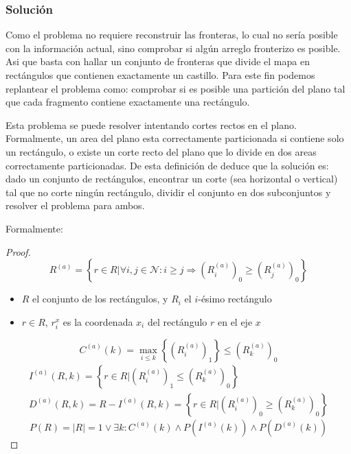 \subsubsection{Solución}

Como el problema no requiere reconstruir las fronteras, lo cual no sería posible con la información actual, sino comprobar si algún arreglo fronterizo es posible. Asi que basta con hallar un conjunto de fronteras que divide el mapa en rectángulos que contienen exactamente un castillo. Para este fin podemos replantear el problema como: comprobar si es posible una partición del plano tal que cada fragmento contiene exactamente una rectángulo.

Esta problema se puede resolver intentando cortes rectos en el plano. Formalmente, un area del plano esta correctamente particionada si contiene solo un rectángulo, o existe un corte recto del plano que lo divide en dos areas correctamente particionadas. De esta definición de deduce que la solución es: dado un conjunto de rectángulos, encontrar un corte (sea horizontal o vertical) tal que no corte ningún rectángulo, dividir el conjunto en dos subconjuntos y resolver el problema para ambos.

Formalmente:

\begin{proof}
  \begin{equation}
    R^{(a)}=\left\{r\in R|\forall i,j\in \mathcal{N}:i\geq j\Rightarrow (R^{(a)}_i)_0\geq(R^{(a)}_j)_0\right\}
    \label{eq:sortedby}
  \end{equation}
  \begin{itemize}
    \item \(R\) el conjunto de los rectángulos, y \(R_i\) el \(i\)-ésimo rectángulo
    \item \(r\in R\), \(r^x_{i}\) es la coordenada \(x_i\) del rectángulo \(r\) en el eje \(x\)
  \end{itemize}
  \begin{equation}
    C^{(a)}(k)=\max_{i\leq k}{\left\{(R^{(a)}_i)_1\right\}}\leq (R^{(a)}_k)_0
    \label{eq:goodcut}
  \end{equation}
  \begin{align}
    I^{(a)}(R,k)=\left\{r\in R|(R^{(a)}_i)_1\leq (R^{(a)}_k)_0\right\} \label{eq:leftsplit} \\
    D^{(a)}(R,k)=R-I^{(a)}(R,k)=\left\{r\in R|(R^{(a)}_i)_0\geq (R^{(a)}_k)_0\right\} \label{eq:rightsplit}
  \end{align}
  \begin{equation}
    P(R)=\left\lvert R\right\rvert=1\lor \exists k: C^{(a)}(k)\land P(I^{(a)}(k))\land P(D^{(a)}(k))
    \label{eq:goodr}
  \end{equation}
\end{proof}

